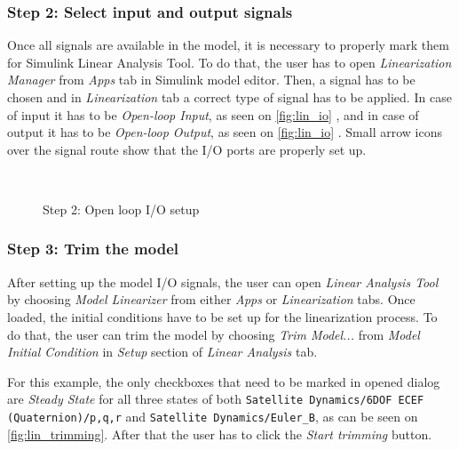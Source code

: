     \subsubsection*{Step 2: Select input and output signals}

        Once all signals are available in the model, it is necessary to properly mark them for Simulink Linear Analysis Tool. To do that, the user has to open \textit{Linearization Manager} from \textit{Apps} tab in Simulink model editor. Then, a signal has to be chosen and in \textit{Linearization} tab a correct type of signal has to be applied. In case of input it has to be \textit{Open-loop Input}, as seen on \autoref{fig:lin_io} , and in case of output it has to be \textit{Open-loop Output}, as seen on \autoref{fig:lin_io} . Small arrow icons over the signal route show that the I/O ports are properly set up.

        \begin{figure}[H]
            \centering
            \\
            \caption{Step 2: Open loop I/O setup}%
            \label{fig:lin_io}%
        \end{figure}

        

    \subsubsection*{Step 3: Trim the model}
        After setting up the model I/O signals, the user can open \textit{Linear Analysis Tool} by choosing \textit{Model Linearizer} from either \textit{Apps} or \textit{Linearization} tabs. Once loaded, the initial conditions have to be set up for the linearization process. To do that, the user can trim the model by choosing \textit{Trim Model...} from \textit{Model Initial Condition} in \textit{Setup} section of \textit{Linear Analysis} tab.
         
        For this example, the only checkboxes that need to be marked in opened dialog are \textit{Steady State} for all three states of both \verb|Satellite Dynamics/6DOF ECEF| \verb|(Quaternion)/p,q,r| and \verb|Satellite Dynamics/Euler_B|, as can be seen on \autoref{fig:lin_trimming}. After that the user has to click the \textit{Start trimming} button.

